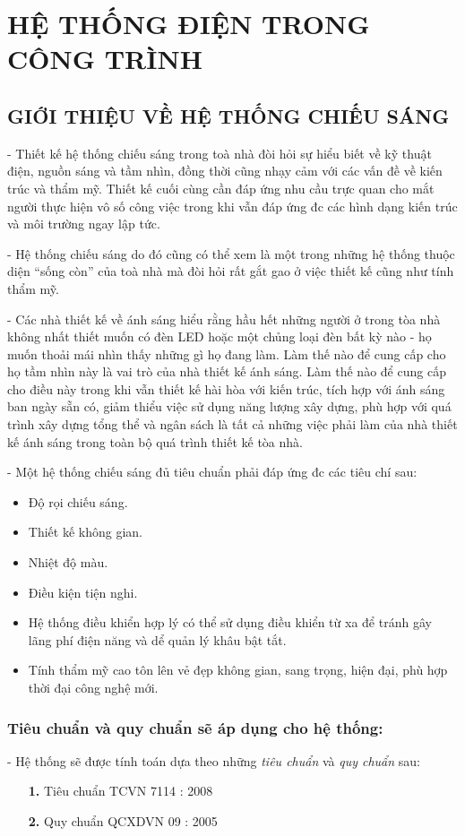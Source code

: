 	\section{HỆ THỐNG ĐIỆN TRONG CÔNG TRÌNH}
	\subsection{GIỚI THIỆU VỀ HỆ THỐNG CHIẾU SÁNG}	
	- Thiết kế hệ thống chiếu sáng trong toà nhà đòi hỏi sự hiểu biết về kỹ thuật điện, nguồn sáng và tầm nhìn, đồng thời cũng nhạy cảm với các vấn đề về kiến trúc và thẩm mỹ. Thiết kế cuối cùng cần đáp ứng nhu cầu trực quan cho mắt người thực hiện vô số công việc trong khi vẫn đáp ứng đc các hình dạng kiến trúc và môi trường ngay lập tức.
	
	- Hệ thống chiếu sáng do đó cũng có thể xem là một trong những hệ thống thuộc diện ``sống còn'' của toà nhà mà đòi hỏi rất gắt gao ở việc thiết kế cũng như tính thẩm mỹ.
	
	- Các nhà thiết kế về ánh sáng hiểu rằng hầu hết những người ở trong tòa nhà không nhất thiết muốn có đèn LED hoặc một chủng loại đèn bất kỳ nào - họ muốn thoải mái nhìn thấy những gì họ đang làm. Làm thế nào để cung cấp cho họ tầm nhìn này là vai trò của nhà thiết kế ánh sáng. Làm thế nào để cung cấp cho điều này trong khi vẫn thiết kế hài hòa với kiến trúc, tích hợp với ánh sáng ban ngày sẵn có, giảm thiểu việc sử dụng năng lượng xây dựng, phù hợp với quá trình xây dựng tổng thể và ngân sách là tất cả những việc phải làm của nhà thiết kế ánh sáng trong toàn bộ quá trình thiết kế tòa nhà.
	
	- Một hệ thống chiếu sáng đủ tiêu chuẩn phải đáp ứng đc các tiêu chí sau:
	\begin{itemize}[leftmargin=3cm]
		\item Độ rọi chiếu sáng.
		\item Thiết kế không gian.
		\item Nhiệt độ màu.
		\item Điều kiện tiện nghi.
		\item Hệ thống điều khiển hợp lý có thể sử dụng điều khiển từ xa để tránh gây lãng phí điện năng và dể quản lý khâu bật tắt.
		\item Tính thẩm mỹ cao tôn lên vẻ đẹp không gian, sang trọng, hiện đại, phù hợp thời đại công nghệ mới.
	\end{itemize}
	\subsubsection{Tiêu chuẩn và quy chuẩn sẽ áp dụng cho hệ thống:}		
	- Hệ thống sẽ được tính toán dựa theo những \emph{tiêu chuẩn} và \emph{quy chuẩn} sau:
	\begin{itemize}
		\setlength{\itemindent}{2cm}
		\item[\textbf{1.}]Tiêu chuẩn TCVN 7114 : 2008 
		\item[\textbf{2.}]Quy chuẩn QCXDVN 09 : 2005
	\end{itemize}	
	
